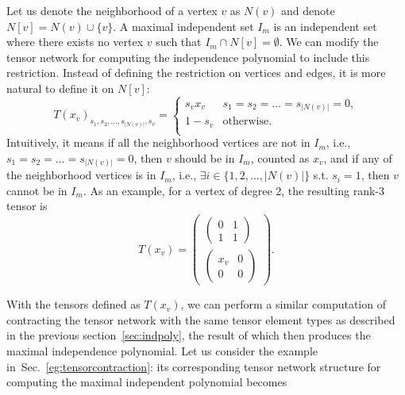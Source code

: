 \documentclass[onefignum, onetabnum]{siamart190516}
\newcommand{\<}{\langle}
\renewcommand{\>}{\rangle}
\newcommand{\Sec}[1]{Sec.~\ref{#1}}
\newcounter{example}
\begin{document}
Let us denote the neighborhood of a vertex $v$ as $N(v)$ and denote $N[v] = N(v)\cup \{v\}$.
A maximal independent set $I_m$ is an independent set where there exists no vertex $v$ such that $I_m \cap N[v]  = \emptyset$.
We can modify the tensor network for computing the independence polynomial to include this restriction. Instead of defining the restriction on vertices and edges, it is more natural to define it on $N[v]$:
\begin{equation}\label{eq:maximal}
    T(x_v)_{s_1,s_2,\ldots,s_{|N(v)|},s_v} = \begin{cases}
        s_vx_v & s_1=s_2=\ldots=s_{|N(v)|}=0,\\
        1-s_v& \text{otherwise}.\\
    \end{cases}
\end{equation}
Intuitively, it means if all the neighborhood vertices are not in $I_{m}$, i.e., $ s_1=s_2=\ldots=s_{|N(v)|}=0$, then $v$ should be in $I_{m}$, counted as $x_{v}$,
and if any of the neighborhood vertices is in $I_{m}$, i.e., $\exists i \in \{1,2,\ldots, |N(v)|\}$ s.t. $s_{i} = 1$, then $v$ cannot be in $I_{m}$.
As an example, for a vertex of degree 2, the resulting rank-3 tensor is
\begin{equation}
    T(x_v)=\left(\begin{matrix}
    \left(\begin{matrix}
        0 &1 \\
        1 &1
    \end{matrix}\right)\\
    \left(\begin{matrix}
        x_v &0 \\
        0 &0
    \end{matrix}\right)
    \end{matrix}\right).
\end{equation}
 
With the tensors defined as $T(x_v)$, we can perform a similar computation of contracting the tensor network with the same tensor element types as described in the previous section~\ref{sec:indpoly}, the result of which then produces the maximal independence polynomial. Let us consider the example in~\Sec{eg:tensorcontraction}: its corresponding tensor network structure for computing the maximal independent polynomial becomes
\end{document}
